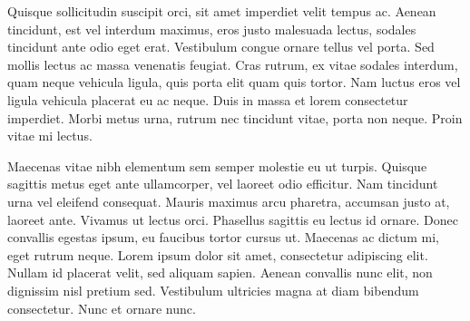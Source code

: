 Quisque sollicitudin suscipit orci, sit amet imperdiet velit tempus ac. Aenean tincidunt, est vel interdum maximus, eros justo malesuada lectus, sodales tincidunt ante odio eget erat. Vestibulum congue ornare tellus vel porta. Sed mollis lectus ac massa venenatis feugiat. Cras rutrum, ex vitae sodales interdum, quam neque vehicula ligula, quis porta elit quam quis tortor. Nam luctus eros vel ligula vehicula placerat eu ac neque. Duis in massa et lorem consectetur imperdiet. Morbi metus urna, rutrum nec tincidunt vitae, porta non neque. Proin vitae mi lectus.

Maecenas vitae nibh elementum sem semper molestie eu ut turpis. Quisque sagittis metus eget ante ullamcorper, vel laoreet odio efficitur. Nam tincidunt urna vel eleifend consequat. Mauris maximus arcu pharetra, accumsan justo at, laoreet ante. Vivamus ut lectus orci. Phasellus sagittis eu lectus id ornare. Donec convallis egestas ipsum, eu faucibus tortor cursus ut. Maecenas ac dictum mi, eget rutrum neque. Lorem ipsum dolor sit amet, consectetur adipiscing elit. Nullam id placerat velit, sed aliquam sapien. Aenean convallis nunc elit, non dignissim nisl pretium sed. Vestibulum ultricies magna at diam bibendum consectetur. Nunc et ornare nunc.